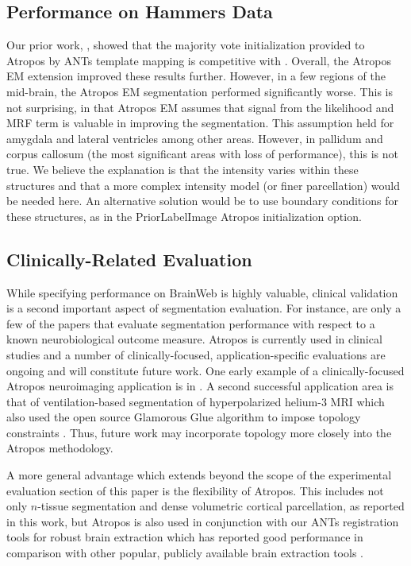 \documentclass[11pt,english]{article}
\begin{document}
\subsection{Performance on Hammers Data}
Our prior work, \citep{Avants2011}, showed that the majority vote
initialization provided to Atropos by ANTs template mapping is
competitive with \cite{Heckemann2006}.  Overall, the Atropos EM
extension improved these results further.  However, in a few regions
of the mid-brain, the Atropos EM segmentation
performed significantly worse.  This is not surprising, in that
Atropos EM assumes that signal from the likelihood and MRF term is
valuable in improving the segmentation.  This assumption held for
amygdala and lateral ventricles among other areas.  However, in
pallidum and corpus callosum (the most significant areas with loss of
performance), this is not true.  We believe the explanation is that
the intensity varies within these structures and that a more complex
intensity model (or finer parcellation) would be needed here.  An
alternative solution would be to use boundary conditions for these
structures, as in the {\ttfamily PriorLabelImage} Atropos initialization option.

\subsection{Clinically-Related Evaluation}
While specifying performance on BrainWeb is highly
valuable, clinical validation is a second important aspect of
segmentation evaluation.  For instance, 
\citep{Freeborough1997,Westlye2009,Sanchez-Benavides2010,Chou2009,Bresser2011}
are only a few of the papers that evaluate segmentation performance with
respect to a known neurobiological outcome measure.  Atropos is
currently used in clinical studies and a number of clinically-focused,
application-specific evaluations are ongoing and will constitute
future work.  One early example of a clinically-focused Atropos
neuroimaging application is in \citep{Avants2010c}.  A second successful
application area is that of ventilation-based segmentation of hyperpolarized helium-3 MRI
\citep{Tustison2010a} which also used the open source Glamorous Glue
algorithm to impose topology constraints \citep{Tustison2010b}.  Thus, future work may
incorporate topology more closely into the Atropos methodology.  

A more general advantage which extends beyond the scope of the experimental 
evaluation section of this paper is the flexibility of Atropos.   This includes 
not only $n$-tissue segmentation and dense volumetric cortical parcellation,
as reported in this work, but Atropos is also used in conjunction with our ANTs registration tools for robust
brain extraction which has reported good performance in comparison with other
popular, publicly available brain extraction tools \citep{Avants2010a}.  
 
\end{document}
